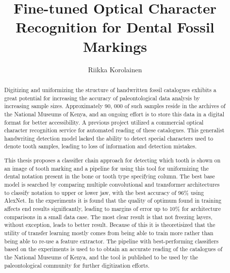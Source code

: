 \documentclass[english,twoside,openright]{UH_DS_MSc}
\title{Fine-tuned Optical Character Recognition for Dental Fossil Markings}
\author{Riikka Korolainen}
\date{\thesisdate}
\begin{document}
\maketitle


\begin{abstract}

Digitizing and uniformizing the structure of handwritten fossil catalogues exhibits a great 
potential for increasing the accuracy of paleontological data analysis by increasing sample sizes. 
Approximately 90, 000 of such samples reside in the archives of the National Museums of Kenya, and 
an ongoing effort is to store this data in a digital format for better accessibility.
A previous project utilized a commercial optical character recognition service for automated reading of these catalogues. This generalist
handwriting detection model lacked the ability to detect special characters used to denote tooth samples,
 leading to loss of information and detection mistakes.

This thesis proposes a classifier chain approach for detecting which tooth is shown on an image of tooth marking 
and a pipeline for using this tool for uniformizing the dental notation present in 
the bone or tooth type specifying column. The best base model is searched by comparing multiple convolutional and transformer architectures
to classify notation to upper or lower jaw, with the best accuracy of 96\% using AlexNet. 
In the experiments it is found that the quality of optimum found in training affects end results significantly,
leading to margins of error up to 10\% for architecture comparisons in a small data case.
The most clear result is that not freezing layers, without exception, leads to better result.
Because of this it is theoretisized that the utility of transfer learning mostly comes from 
being able to train more rather than being able to re-use a feature extractor.
The pipeline with best-performing classifiers based on the experiments is used to
to obtain an accurate reading of the catalogues of the National Museums of Kenya, and the tool is published to be used 
by the paleontological community for further digitization efforts.

\end{abstract}
\end{document}
